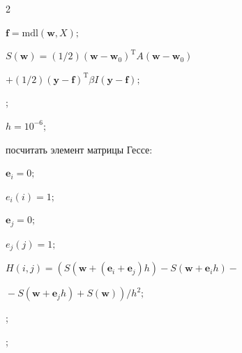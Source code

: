 \begin{multicols}{2}
\begin{algorithmic}


        \STATE$\mathbf{f} = \text{mdl}(\mathbf{w}, X);$

        \STATE$S(\mathbf{w}) = ({1}/{2})(\mathbf{w}-\mathbf{w}_0)^{\mathrm{T}}

        A(\mathbf{w}-\mathbf{w}_0)$

        \STATE$+({1}/{2})(\mathbf{y}-\mathbf{f})^{\mathrm{T}}\beta I(\mathbf{y}-\mathbf{f});$

    \ENDWHILE

    \EXIT ;


\end{algorithmic}



\begin{algorithmic}


    \STATE$h=10^{-6};$ 



        \STATE посчитать элемент матрицы Гессе:

        \STATE $\mathbf{e}_i=0;$ 

        \STATE $e_i(i)=1;$

        \STATE $\mathbf{e}_j=0;$

        \STATE $e_j(j)=1;$

        \STATE $H(i,j) =

        \left(S(\mathbf{w}+(\mathbf{e}_i+\mathbf{e}_j)h)-S(\mathbf{w}+\mathbf{e}_{i}h)-{}\right.$

        \STATE $\left.{}-S(\mathbf{w}+\mathbf{e}_{j}h)+S(\mathbf{w})\right)/h^2;$

        \ENDFOR

        \EXIT ;

    \ENDFOR

    \EXIT ;


\end{algorithmic}




\end{multicols}
